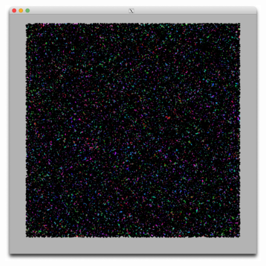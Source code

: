 \documentclass[letterpaper,11pt]{exam}
\begin{document}
\begin{figure}[h]
\begin{minipage}{0.3\textwidth}
        \label{fig:question1b}
    \end{minipage}
    \hspace{0.2cm}
    \begin{minipage}{0.3\textwidth}
        \centering
        \includegraphics[width=\textwidth]{img/extreme_4096.jpg}
        \label{fig:question1b}
    \end{minipage}


\end{figure}
\end{document}
